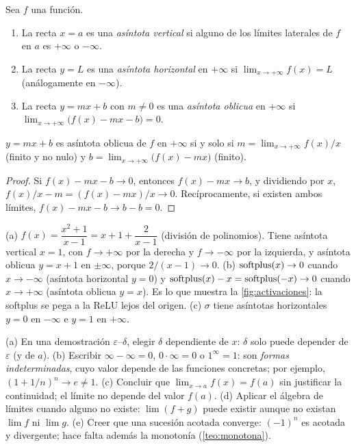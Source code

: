 \begin{definicion}[Asíntotas]\label{def:asintotas}
Sea $f$ una función.
\begin{enumerate}
  \item La recta $x=a$ es una \emph{asíntota vertical} si alguno de los límites laterales de $f$ en $a$ es $+\infty$ o $-\infty$.
  \item La recta $y=L$ es una \emph{asíntota horizontal} en $+\infty$ si $\lim_{x\to+\infty}f(x)=L$ (análogamente en $-\infty$).
  \item La recta $y=mx+b$ con $m\ne0$ es una \emph{asíntota oblicua} en $+\infty$ si $\lim_{x\to+\infty}\bigl(f(x)-mx-b\bigr)=0$.
\end{enumerate}
\end{definicion}

\begin{proposicion}\label{prop:oblicua}
$y=mx+b$ es asíntota oblicua de $f$ en $+\infty$ si y solo si $m=\lim_{x\to+\infty}f(x)/x$ (finito y no nulo) y $b=\lim_{x\to+\infty}\bigl(f(x)-mx\bigr)$ (finito).
\end{proposicion}

\begin{proof}
Si $f(x)-mx-b\to0$, entonces $f(x)-mx\to b$, y dividiendo por $x$, $f(x)/x-m=(f(x)-mx)/x\to0$. Recíprocamente, si existen ambos límites, $f(x)-mx-b\to b-b=0$.
\end{proof}

\begin{ejemplo}\label{ej:asintotas}
(a) $f(x)=\dfrac{x^{2}+1}{x-1}=x+1+\dfrac{2}{x-1}$ (división de polinomios). Tiene asíntota vertical $x=1$, con $f\to+\infty$ por la derecha y $f\to-\infty$ por la izquierda, y asíntota oblicua $y=x+1$ en $\pm\infty$, porque $2/(x-1)\to0$.
(b) $\operatorname{softplus}(x)\to0$ cuando $x\to-\infty$ (asíntota horizontal $y=0$) y $\operatorname{softplus}(x)-x=\operatorname{softplus}(-x)\to0$ cuando $x\to+\infty$ (asíntota oblicua $y=x$). Es lo que muestra la \cref{fig:activaciones}: la softplus se pega a la ReLU lejos del origen.
(c) $\sigma$ tiene asíntotas horizontales $y=0$ en $-\infty$ e $y=1$ en $+\infty$.
\end{ejemplo}

\begin{observacion}\label{obs:2-errores}
(a) En una demostración $\varepsilon$--$\delta$, elegir $\delta$ dependiente de $x$: $\delta$ solo puede depender de $\varepsilon$ (y de $a$).
(b) Escribir $\infty-\infty=0$, $0\cdot\infty=0$ o $1^{\infty}=1$: son \emph{formas indeterminadas}, cuyo valor depende de las funciones concretas; por ejemplo, $(1+1/n)^{n}\to e\ne1$.
(c) Concluir que $\lim_{x\to a}f(x)=f(a)$ sin justificar la continuidad; el límite no depende del valor $f(a)$.
(d) Aplicar el álgebra de límites cuando alguno no existe: $\lim(f+g)$ puede existir aunque no existan $\lim f$ ni $\lim g$.
(e) Creer que una sucesión acotada converge: $(-1)^{n}$ es acotada y divergente; hace falta además la monotonía (\cref{teo:monotona}).
\end{observacion}

